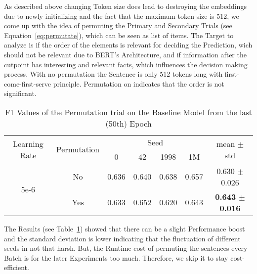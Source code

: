As described above changing Token size does lead to destroying the embeddings due to newly
initializing and the fact that the maximum token size is 512, we come up with the idea
of permuting the Primary and Secondary Trials (see Equation~\ref{eq:permutate}), which can be seen as list of items.
The Target to analyze is if the order of the elements is relevant for deciding the Prediction, 
wich should not be relevant due to BERT's Architecture, and
if information after the cutpoint has interesting and relevant facts, which influences
the decision making process. With no permutation the 
Sentence is only 512 tokens long with first-come-first-serve principle. Permutation on
indicates that the order is not significant.

\begin{table}[!t]
    \centering
    \caption{F1 Values of the Permutation trial on the Baseline Model from the last (50th) Epoch}
    \label{tab:my-permutation}
    \begin{tabular}{|c|c||cccc|c|}
    \hline
    \multirow{2}{*}{Learning Rate} & \multirow{2}{*}{Permutation} & \multicolumn{4}{c|}{Seed}                                                                    & \multirow{2}{*}{mean $\pm$ std} \\ \cline{3-6}
                                   &                              & \multicolumn{1}{c|}{0}     & \multicolumn{1}{c|}{42}    & \multicolumn{1}{c|}{1998}  & 1M    &                                 \\ \hline \hline
    \multirow{2}{*}{5e-6}          & No                           & \multicolumn{1}{c|}{0.636} & \multicolumn{1}{c|}{0.640} & \multicolumn{1}{c|}{0.638} & 0.657 & 0.630 $\pm$ 0.026               \\ \cline{2-7} 
                                   & Yes                          & \multicolumn{1}{c|}{0.633} & \multicolumn{1}{c|}{0.652} & \multicolumn{1}{c|}{0.620} & 0.643 & \textbf{0.643 $\pm$ 0.016}      \\ \hline
    \end{tabular}
\end{table}

The Results (see Table~\ref{tab:my-permutation}) showed that there can be a slight Performance boost and the standard deviation is lower
indicating that the fluctuation of different seeds in not that harsh. But, the Runtime cost of permuting the
sentences every Batch is for the later Experiments too much. Therefore, we skip it to stay cost-efficient.















